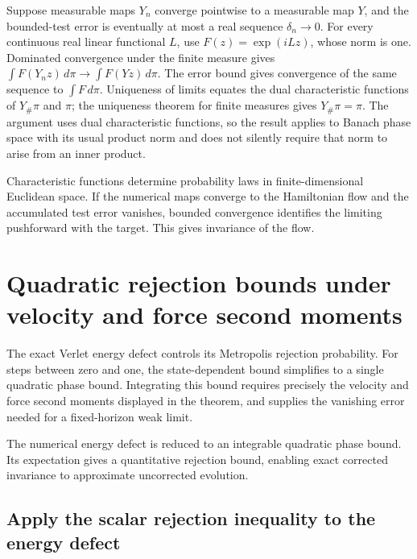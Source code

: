 \documentclass[11pt,a4paper]{report}
\begin{document}
Suppose measurable maps \(Y_n\) converge pointwise to a measurable map \(Y\), and the bounded-test error is eventually at most a real sequence \(\delta_n\to0\). For every continuous real linear functional \(L\), use \(F(z)=\exp(iLz)\), whose norm is one. Dominated convergence under the finite measure gives \(\int F(Y_nz)\,d\pi\to\int F(Yz)\,d\pi\). The error bound gives convergence of the same sequence to \(\int F\,d\pi\). Uniqueness of limits equates the dual characteristic functions of \(Y_\#\pi\) and \(\pi\); the uniqueness theorem for finite measures gives \(Y_\#\pi=\pi\). The argument uses dual characteristic functions, so the result applies to Banach phase space with its usual product norm and does not silently require that norm to arise from an inner product.



Characteristic functions determine probability laws in finite-dimensional Euclidean space. If the numerical maps converge to the Hamiltonian flow and the accumulated test error vanishes, bounded convergence identifies the limiting pushforward with the target. This gives invariance of the flow.

\section{\texorpdfstring{Quadratic rejection bounds under velocity and force second moments}{Quadratic rejection bounds under velocity and force second moments}}
\label{proof-module-KineticLangevin-HamiltonianRejection-lean}


The exact Verlet energy defect controls its Metropolis rejection probability. For steps between zero and one, the state-dependent bound simplifies to a single quadratic phase bound. Integrating this bound requires precisely the velocity and force second moments displayed in the theorem, and supplies the vanishing error needed for a fixed-horizon weak limit.



The numerical energy defect is reduced to an integrable quadratic phase bound. Its expectation gives a quantitative rejection bound, enabling exact corrected invariance to approximate uncorrected evolution.

\subsection{\texorpdfstring{Apply the scalar rejection inequality to the energy defect}{Apply the scalar rejection inequality to the energy defect}}
\label{report-step-KineticLangevin-HamiltonianRejection-lean-1}
\end{document}

